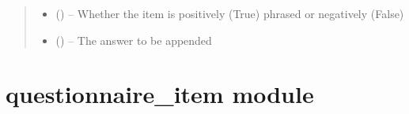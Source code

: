 \documentclass[letterpaper,10pt,english]{sphinxmanual}
\begin{document}
\begin{fulllineitems}
\begin{fulllineitems}
\begin{quote}
\begin{description}
\begin{itemize}
\item {} 
 (\href{https://docs.python.org/2/library/functions.html\#bool}{}) -- Whether the item is positively (True) phrased or negatively (False)

\item {} 
 (\href{https://docs.python.org/2/library/string.html\#module-string}{}) -- The answer to be appended

\end{itemize}

\end{description}\end{quote}

\end{fulllineitems}


\end{fulllineitems}



\section{questionnaire\_item module}
\label{\detokenize{questionnaire_item:questionnaire-item-module}}\label{\detokenize{questionnaire_item::doc}}\label{\detokenize{questionnaire_item:module-questionnaire_item}}
\end{document}
